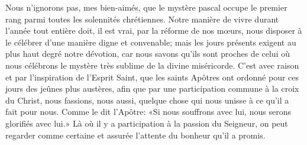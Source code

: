 Nous n’ignorons pas, mes bien-aimés,
	que le mystère pascal occupe le premier rang
		parmi toutes les solennités chrétiennes.
Notre manière de vivre durant l’année tout entière
	doit, il est vrai, par la réforme de nos mœurs,
	nous disposer à le célébrer d’une manière digne et convenable;
	mais les jours présents exigent au plus haut degré notre dévotion,
	car nous savons qu’ils sont proches de celui où nous célébrons
		le mystère très sublime de la divine miséricorde.
C’est avec raison et par l’inspiration de l’Esprit Saint,
	que les saints Apôtres ont ordonné pour ces jours des jeûnes plus austères,
	afin que par une participation commune à la croix du Christ,
	nous fassions, nous aussi, quelque chose qui nous unisse
		à ce qu’il a fait pour nous.
Comme le dit l’Apôtre:
	«Si nous souffrons avec lui, nous serons glorifiés avec lui.»
Là où il y a participation à la passion du Seigneur,
	on peut regarder comme certaine et assurée
		l’attente du bonheur qu’il a promis.
